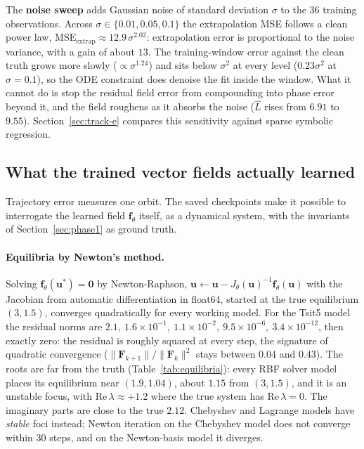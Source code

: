 The \textbf{noise sweep} adds Gaussian noise of standard deviation $\sigma$
to the 36 training observations. Across $\sigma\in\{0.01,0.05,0.1\}$ the
extrapolation MSE follows a clean power law,
$\mathrm{MSE}_{\text{extrap}}\approx12.9\,\sigma^{2.02}$: extrapolation
error is proportional to the noise variance, with a gain of about $13$. The
training-window error against the clean truth grows more slowly
($\propto\sigma^{1.24}$) and sits below $\sigma^2$ at every level
($0.23\sigma^2$ at $\sigma=0.1$), so the ODE constraint does denoise the
fit inside the window. What it cannot do is stop the residual field error
from compounding into phase error beyond it, and the field roughens as it
absorbs the noise ($\hat L$ rises from $6.91$ to $9.55$). Section~\ref{sec:track-e}
compares this sensitivity against sparse symbolic regression.

\subsection{What the trained vector fields actually learned}
\label{sec:numerics}

Trajectory error measures one orbit. The saved checkpoints make it possible
to interrogate the learned field $\mathbf{f}_\theta$ itself, as a dynamical
system, with the invariants of Section~\ref{sec:phase1} as ground truth.

\paragraph{Equilibria by Newton's method.} Solving
$\mathbf{f}_\theta(\mathbf{u}^\ast)=\mathbf{0}$ by Newton-Raphson,
$\mathbf{u}\leftarrow\mathbf{u}-J_\theta(\mathbf{u})^{-1}\mathbf{f}_\theta(\mathbf{u})$
with the Jacobian from automatic differentiation in float64, started at the
true equilibrium $(3,1.5)$, converges quadratically for every working model.
For the Tsit5 model the residual norms are
$2.1,\ 1.6\times10^{-1},\ 1.1\times10^{-2},\ 9.5\times10^{-6},\ 3.4\times10^{-12}$,
then exactly zero: the residual is roughly squared at every step, the
signature of quadratic convergence ($\|\mathbf{F}_{k+1}\|/\|\mathbf{F}_k\|^2$
stays between $0.04$ and $0.43$). The roots are far from the truth (Table~\ref{tab:equilibria}):
every RBF solver model places its equilibrium near $(1.9,1.04)$, about $1.15$ from
$(3,1.5)$, and it is an unstable focus, with $\mathrm{Re}\,\lambda\approx+1.2$
where the true system has $\mathrm{Re}\,\lambda=0$. The imaginary parts are
close to the true $2.12$. Chebyshev and Lagrange models have \emph{stable}
foci instead; Newton iteration on the Chebyshev model does not converge
within 30 steps, and on the Newton-basis model it diverges.

